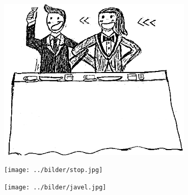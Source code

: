 \begin{intersong}
	\begin{center}
		\includegraphics[width=0.7\textwidth]{../bilder/fardigabilder/CamillasFardigaBilder/Punschenkommer2.png} 
	\end{center}
\end{intersong}
\sclearpage

\sclearpage

\sclearpage

\sclearpage

\sclearpage


\sclearpage


\sclearpage

\begin{intersong}
\begin{center}
\texttt{[image: ../bilder/stop.jpg]} 
\end{center}
\end{intersong}
\sclearpage

\sclearpage

\begin{intersong}
\begin{center}
\texttt{[image: ../bilder/javel.jpg]} 
\end{center}
\end{intersong}
\sclearpage

\sclearpage

\sclearpage

\sclearpage

\sclearpage

\sclearpage

\sclearpage

\sclearpage

\sclearpage

\sclearpage

\sclearpage

\sclearpage

